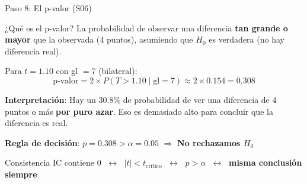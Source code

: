 \documentclass[aspectratio=169, 11pt]{beamer}
\begin{document}
\begin{frame}{Paso 8: El p-valor (S06)}
\small

\begin{block}{¿Qué es el p-valor?}
La probabilidad de observar una diferencia \textbf{tan grande o mayor} que la observada (4 puntos), \alert{asumiendo que $H_0$ es verdadera} (no hay diferencia real).
\end{block}

\vspace{0.2cm}
Para $t = 1.10$ con gl $= 7$ (bilateral):
\[
\text{p-valor} = 2 \times P(T > 1.10 \mid \text{gl} = 7) \approx 2 \times 0.154 = \boxed{0.308}
\]

\vspace{0.2cm}
\textbf{Interpretación}: Hay un 30.8\% de probabilidad de ver una diferencia de 4 puntos o más \textbf{por puro azar}. Eso es demasiado alto para concluir que la diferencia es real.

\vspace{0.2cm}
\textbf{Regla de decisión}: $p = 0.308 > \alpha = 0.05$ $\Rightarrow$ \textbf{No rechazamos $H_0$}

\vspace{0.2cm}
\begin{exampleblock}{Consistencia}
IC contiene 0 $\;\leftrightarrow\;$ $|t| < t_{\text{crítico}}$ $\;\leftrightarrow\;$ $p > \alpha$ $\;\leftrightarrow\;$ \textbf{misma conclusión siempre}
\end{exampleblock}
\end{frame}
\end{document}
